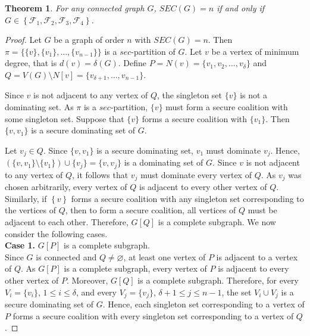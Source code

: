 \documentclass[12pt]{article}
\newtheorem{theorem}{Theorem}[section]
\begin{document}
 \begin{theorem}\label{nsecnumber}
    For any connected graph $G$, $SEC(G)=n$ if and only if $G\in\left\{\mathcal{F}_1,\mathcal{F}_2,\mathcal{F}_3,\mathcal{F}_4\right\}$.
    \end{theorem}
    \begin{proof}
Let $G$ be a graph of order $n$ with $SEC(G)=n$. Then
$\pi=\{\{v\},\{v_1\},\ldots,\{v_{n-1}\}\}$
is a $sec$-partition of $G$. Let $v$ be a vertex of minimum degree, that is $d(v)=\delta(G)$. Define $P=N(v)=\{v_1,v_2,\ldots,v_\delta\}$ and
$Q=V(G)\setminus N[v]=\{v_{\delta+1},\ldots,v_{n-1}\}$.

Since $v$ is not adjacent to any vertex of $Q$, the singleton set $\{v\}$ is not a dominating set. As $\pi$ is a $sec$-partition, $\{v\}$ must form a secure coalition with some singleton set. Suppose that $\{v\}$ forms a secure coalition with $\{v_1\}$. Then $\{v,v_1\}$ is a secure dominating set of $G$.

Let $v_j\in Q$. Since $\{v,v_1\}$ is a secure dominating set, $v_1$ must dominate $v_j$. Hence, $(\{v,v_1\}\setminus\{v_1\})\cup\{v_j\}=\{v,v_j\}$ is a dominating set of $G$. Since $v$ is not adjacent to any vertex of $Q$, it follows that $v_j$ must dominate every vertex of $Q$. As $v_j$ was chosen arbitrarily, every vertex of $Q$ is adjacent to every other vertex of $Q$.\\
Similarly, if $\left\{v\right\}$ forms a secure coalition with any singleton set corresponding to the vertices of $Q$, then to form a secure coalition, all vertices of $Q$ must be adjacent to each other. Therefore, $G[Q]$ is a complete subgraph.  We now consider the following cases.\\[2mm]
 \textbf{Case 1.} $G[P]$ is a complete subgraph.\\
Since $G$ is connected and $Q\neq \varnothing$, at least one vertex of $P$ is adjacent to a vertex of $Q$. As $G[P]$ is a complete subgraph, every vertex of $P$ is adjacent to every other vertex of $P$. Moreover, $G[Q]$ is a complete subgraph. Therefore, for every $V_i=\{v_i\}$, $1\le i\le \delta$, and every $V_j=\{v_j\}$, $\delta+1\le j\le n-1$, the set $V_i\cup V_j$ is a secure dominating set of $G$. Hence, each singleton set corresponding to a vertex of $P$ forms a secure coalition with every singleton set corresponding to a vertex of $Q$.


\end{proof}
\end{document}
